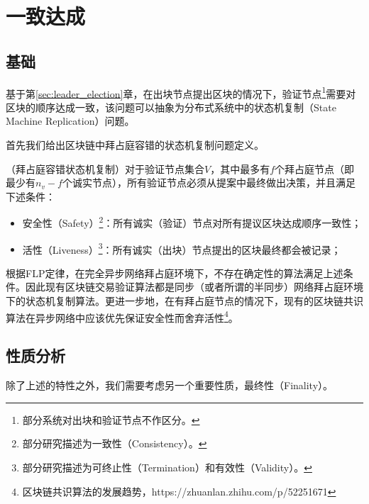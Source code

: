 \section{一致达成}
\label{sec:tx_verification}
\subsection{基础}
基于第\ref{sec:leader_election}章，在出块节点提出区块的情况下，验证节点\footnote{部分系统对出块和验证节点不作区分。}需要对区块的顺序达成一致，该问题可以抽象为分布式系统中的状态机复制（State Machine Replication）问题\cite{pass2017rethinking}。



首先我们给出区块链中拜占庭容错的状态机复制问题定义。
\begin{definition}
（拜占庭容错状态机复制）对于验证节点集合$V$，其中最多有$f$个拜占庭节点（即最少有$n_v-f$个诚实节点），所有验证节点必须从提案中最终做出决策，并且满足下述条件：
\begin{itemize}
	\item 安全性（Safety）\footnote{部分研究描述为一致性（Consistency）。}：所有诚实（验证）节点对所有提议区块达成顺序一致性；
	\item 活性（Liveness）\footnote{部分研究描述为可终止性（Termination）和有效性（Validity）。}：所有诚实（出块）节点提出的区块最终都会被记录；
\end{itemize}
\end{definition}

根据FLP定律，在完全异步网络拜占庭环境下，不存在确定性的算法满足上述条件\cite{fischer1982impossibility}。因此现有区块链交易验证算法都是同步（或者所谓的半同步）网络拜占庭环境下的状态机复制算法\cite{gilad2017algorand,castro1999practical}。更进一步地，在有拜占庭节点的情况下，现有的区块链共识算法在异步网络中应该优先保证安全性而舍弃活性\footnote{区块链共识算法的发展趋势，https://zhuanlan.zhihu.com/p/52251671}。


\subsection{性质分析}
除了上述的特性之外，我们需要考虑另一个重要性质，最终性（Finality）。

